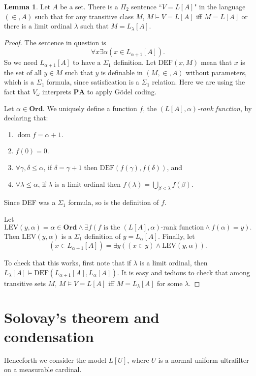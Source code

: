 \documentclass[12pt]{report}
\newcommand{\Ord}{\mathbf{Ord}}
\newcommand{\PA}{\mathbf{PA}}
\DeclareMathOperator{\dom}{dom}
\newcommand{\dfn}[1]{\emph{#1}\index{#1}}
\theoremstyle{definition}
\newtheorem{lemma}[theorem]{Lemma}
\begin{document}
\begin{lemma}
Let $A$ be a set. There is a $\Pi_2$ sentence ``$V = L[A]$" in the language $(\in, A)$ such that for any transitive class $M$, $M \models V = L[A]$ iff $M = L[A]$ or there is a limit ordinal $\lambda$ such that $M = L_\lambda[A]$.
\end{lemma}
\begin{proof}
The sentence in question is
$$\forall x \exists \alpha(x \in L_{\alpha+1}[A]).$$
So we need $L_{\alpha+1}[A]$ to have a $\Sigma_1$ definition.
Let $\text{DEF}(x, M)$ mean that $x$ is the set of all $y \in M$ such that $y$ is definable in $(M, \in, A)$ without parameters, which is a $\Sigma_1$ formula, since satisfication is a $\Sigma_1$ relation.
Here we are using the fact that $V_\omega$ interprets $\PA$ to apply G\"odel coding.

Let $\alpha \in \Ord$. We uniquely define a function $f$, the \dfn{$(L[A], \alpha)$-rank function}, by declaring that:
\begin{enumerate}
\item $\dom f = \alpha + 1$.
\item $f(0) = 0$.
\item $\forall \gamma, \delta \leq \alpha$, if $\delta = \gamma + 1$ then $\text{DEF}(f(\gamma), f(\delta))$, and
\item $\forall \lambda \leq \alpha$, if $\lambda$ is a limit ordinal then $f(\lambda) = \bigcup_{\beta < \lambda} f(\beta)$.
\end{enumerate}
Since DEF was a $\Sigma_1$ formula, so is the definition of $f$.

Let
$$\text{LEV}(y, \alpha) = \alpha \in \Ord \wedge \exists f(\text{$f$ is the $(L[A], \alpha)$-rank function} \wedge f(\alpha) = y).$$
Then $\text{LEV}(y, \alpha)$ is a $\Sigma_1$ definition of $y = L_\alpha[A]$.
Finally, let
$$(x \in L_{\alpha+1}[A]) = \exists y((x \in y) \wedge \text{LEV}(y, \alpha)).$$

To check that this works, first note that if $\lambda$ is a limit ordinal, then $L_\lambda[A] \models \text{DEF}(L_{\alpha+1}[A], L_\alpha[A])$.
It is easy and tedious to check that among transitive sets $M$, $M \models V = L[A]$ iff $M = L_\lambda[A]$ for some $\lambda$.
\end{proof}

\section{Solovay's theorem and condensation}
Henceforth we consider the model $L[U]$, where $U$ is a normal uniform ultrafilter on a measurable cardinal.
\end{document}
